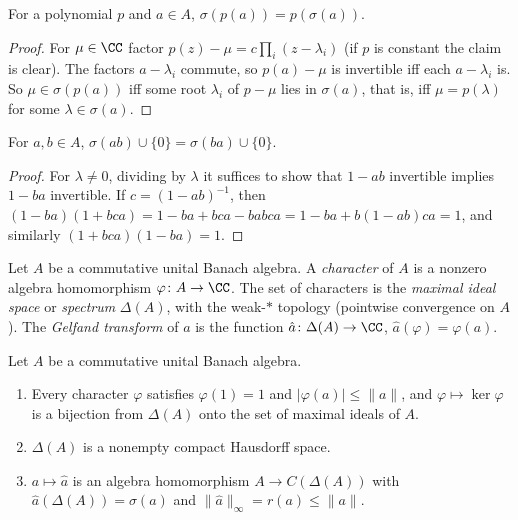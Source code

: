 \begin{proposition}\label{operator-algebras:proposition-spectral-mapping-polynomial}
For a polynomial $p$ and $a \in A$, $\sigma(p(a)) = p(\sigma(a))$.
\end{proposition}

\begin{proof}
For $\mu \in \CC$ factor $p(z) - \mu = c\prod_i(z - \lambda_i)$ (if $p$ is constant the claim is clear). The factors $a - \lambda_i$ commute, so $p(a) - \mu$ is invertible iff each $a - \lambda_i$ is. So $\mu \in \sigma(p(a))$ iff some
root $\lambda_i$ of $p - \mu$ lies in $\sigma(a)$, that is, iff $\mu = p(\lambda)$ for some $\lambda \in \sigma(a)$.
\end{proof}

\begin{lemma}[Jacobson]\label{operator-algebras:lemma-jacobson}
For $a, b \in A$, $\sigma(ab) \cup \{0\} = \sigma(ba) \cup \{0\}$.
\end{lemma}

\begin{proof}
For $\lambda \neq 0$, dividing by $\lambda$ it suffices to show that $1 - ab$ invertible implies $1 - ba$ invertible. If $c = (1 - ab)^{-1}$, then $(1 - ba)(1 + bca) = 1 - ba + bca - babca = 1 - ba + b(1 - ab)ca = 1$, and similarly
$(1 + bca)(1 - ba) = 1$.
\end{proof}

\begin{definition}\label{operator-algebras:definition-character}
Let $A$ be a commutative unital Banach algebra. A \emph{character} of $A$ is a nonzero algebra homomorphism $\varphi \colon A \to \CC$. The set of characters is the \emph{maximal ideal space} or \emph{spectrum} $\Delta(A)$, with the
weak-$*$ topology (pointwise convergence on $A$). The \emph{Gelfand transform} of $a$ is the function $\hat a \colon \Delta(A) \to \CC$, $\hat a(\varphi) = \varphi(a)$.
\end{definition}

\begin{theorem}[Gelfand]\label{operator-algebras:theorem-gelfand}
Let $A$ be a commutative unital Banach algebra.
\begin{enumerate}
\item Every character $\varphi$ satisfies $\varphi(1) = 1$ and $|\varphi(a)| \leq \|a\|$, and $\varphi \mapsto \ker\varphi$ is a bijection from $\Delta(A)$ onto the set of maximal ideals of $A$.
\item $\Delta(A)$ is a nonempty compact Hausdorff space.
\item $a \mapsto \hat a$ is an algebra homomorphism $A \to C(\Delta(A))$ with $\hat a(\Delta(A)) = \sigma(a)$ and $\|\hat a\|_\infty = r(a) \leq \|a\|$.
\end{enumerate}
\end{theorem}

